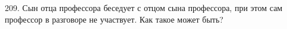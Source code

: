 209. Сын отца профессора беседует с отцом сына профессора, при этом сам профессор в разговоре не участвует. Как такое может быть?\\
